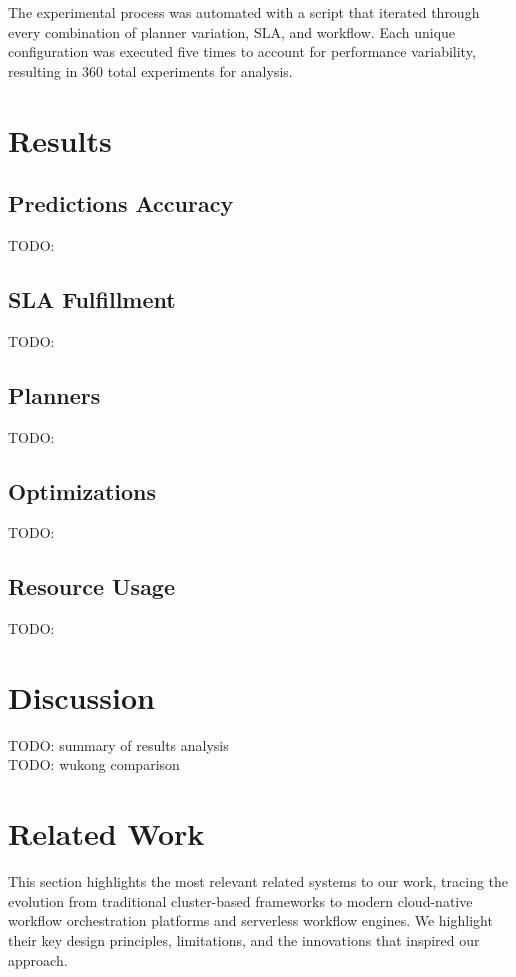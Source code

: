 \documentclass[conference]{IEEEtran}
\begin{document}
The experimental process was automated with a script that iterated through every combination of planner variation, SLA, and workflow. Each unique configuration was executed five times to account for performance variability, resulting in 360 total experiments for analysis.

\section{Results}
\subsection{Predictions Accuracy}
TODO: 

\subsection{SLA Fulfillment}
TODO: 

\subsection{Planners}
TODO: 

\subsection{Optimizations}
TODO: 

\subsection{Resource Usage}
TODO: 

\section{Discussion}
TODO: summary of results analysis\\
TODO: wukong comparison\\


\section{Related Work}
\label{s:related_work}

This section highlights the most relevant related systems to our work, tracing the evolution from traditional cluster-based frameworks to modern cloud-native workflow orchestration platforms and serverless workflow engines. We highlight their key design principles, limitations, and the innovations that inspired our approach.
\end{document}
